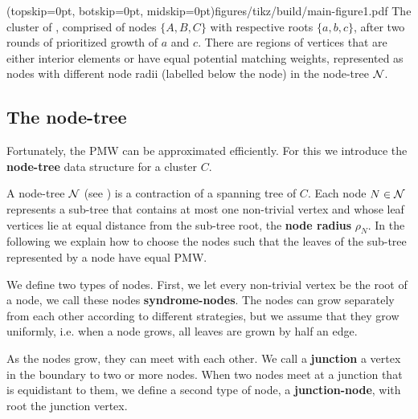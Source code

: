 \Figure[bt](topskip=0pt, botskip=0pt, midskip=0pt){figures/tikz/build/main-figure1.pdf}{
    The cluster of , comprised of nodes $\{A, B, C\}$ with respective roots $\{a, b, c\}$, after two rounds of prioritized growth of $a$ and $c$. There are regions of vertices that are either interior elements or have equal potential matching weights, represented as nodes with different node radii (labelled below the node) in the node-tree $\mathcal{N}$. \label{fig:pmw}}

\subsection{The node-tree}\label{sec:nodeset}
Fortunately, the PMW can be approximated efficiently. 
For this we introduce the \textbf{node-tree} data structure for a cluster $C$. 

A node-tree $\mathcal{N}$ (see ) is a contraction of a spanning tree of $C$. Each node $N\in\mathcal{N}$ represents a sub-tree that contains at most one non-trivial vertex and whose leaf vertices lie at equal distance from the sub-tree root, the \textbf{node radius} $\rho_N$. In the following we explain how to choose the nodes such that the leaves of the sub-tree represented by a node have equal PMW.

We define two types of nodes. First, we let every non-trivial vertex be the root of a node, we call these nodes \textbf{syndrome-nodes}. The nodes can grow separately from each other according to different strategies, but we assume that they grow uniformly, i.e. when a node grows, all leaves are grown by half an edge.

As the nodes grow, they can meet with each other. We call a \textbf{junction} a vertex in the boundary to two or more nodes. When two nodes meet at a junction that is equidistant to them, we define a second type of node, a \textbf{junction-node}, with root the junction vertex. 


